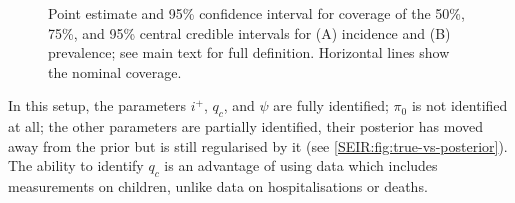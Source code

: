 \documentclass[thesis.tex]{subfiles}
\begin{document}
\begin{figure}
    \vspace{-3cm}
    \caption[Coverage of simulation study (derived quantities)]{%
        Point estimate and 95\% confidence interval for coverage of the 50\%, 75\%, and 95\% central credible intervals for (A) incidence and (B) prevalence; see main text for full definition.
        Horizontal lines show the nominal coverage.
    }
    \label{SEIR:fig:sim-inc-prev}
\end{figure}


In this setup, the parameters $i^+$, $q_c$, and $\psi$ are fully identified; $\pi_0$ is not identified at all; the other parameters are partially identified, their posterior has moved away from the prior but is still regularised by it (see \cref{SEIR:fig:true-vs-posterior}).
The ability to identify $q_c$ is an advantage of using data which includes measurements on children, unlike data on hospitalisations or deaths.
\end{document}
